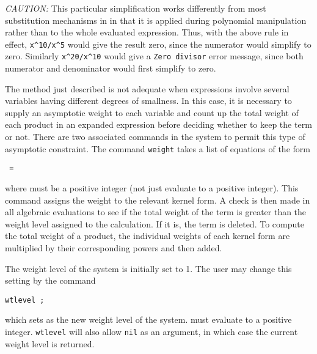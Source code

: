 \textit{CAUTION:}  This particular simplification works differently from most
substitution mechanisms in {\REDUCE} in that it is applied during
polynomial manipulation rather than to the whole evaluated expression.
Thus, with the above rule in effect, 
\texttt{x\textasciicircum 10/x\textasciicircum 5} would give the
result zero, since the numerator would simplify to zero.  Similarly
\texttt{x\textasciicircum 20/x\textasciicircum 10} would give a 
\texttt{Zero divisor} error message,
since both numerator and denominator would first simplify to zero.

\hypertarget{command:WEIGHT}{}
The method just described is not adequate when expressions involve several
variables having different degrees of smallness. In this case, it is
necessary to supply an asymptotic weight to each variable and count up the
total weight of each product in an expanded expression before deciding
whether to keep the term or not. There are two associated commands in the
system to permit this type of asymptotic constraint. The command 
\texttt{weight}
takes a list of equations of the form
\begin{syntax}
  \texttt{ = }
\end{syntax}
where  must be a positive integer (not just evaluate to a
positive integer).  This command assigns the weight  to the
relevant kernel form.  A check is then made in all algebraic evaluations
to see if the total weight of the term is greater than the weight level
assigned to the calculation.  If it is, the term is deleted.  To compute
the total weight of a product, the individual weights of each kernel form
are multiplied by their corresponding powers and then added.

\hypertarget{command:WTLEVEL}{}
The weight level of the system is initially set to 1. The user may change
this setting by the command
\begin{syntax}
        \texttt{wtlevel }\texttt{;}
\end{syntax}
which sets  as the new weight level of the system.
 must evaluate to a positive integer.  \texttt{wtlevel} will also
allow \texttt{nil} as an argument, in which case the current weight level is returned.
